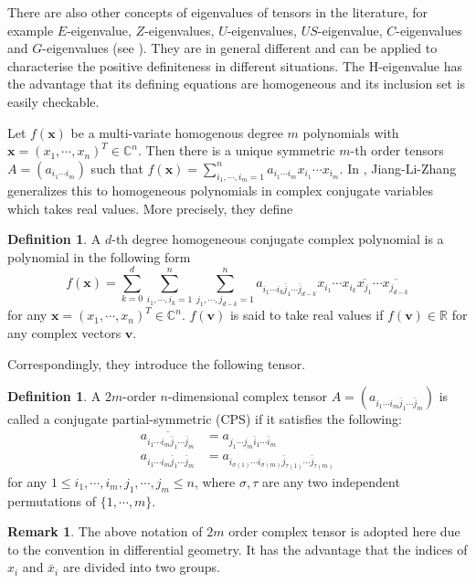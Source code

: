 \documentclass[10pt,reqno]{amsart}
\theoremstyle{definition}
\newtheorem{defn}[thm]{Definition}
\newtheorem{remk}[thm]{Remark}
\begin{document}
There are also other concepts of eigenvalues of tensors in the literature, for example $E$-eigenvalue, $Z$-eigenvalues, $U$-eigenvalues, $US$-eigenvalue, $C$-eigenvalues and $G$-eigenvalues (see \cite{JLZ}\cite{NQB}\cite{N}\cite{Q1}). They are in general different and can be applied to characterise the positive definiteness in different situations. The H-eigenvalue has the advantage that its defining equations are homogeneous and its inclusion set is easily checkable.

  Let $f(\mathbf{x})$ be a multi-variate homogenous degree $m$ polynomials with $\mathbf{x}=(x_1,\cdots, x_n)^T\in \mathbb C^n$. Then there is a unique symmetric $m$-th order tensors $A=(a_{i_1\cdots i_m})$ such that $f(\mathbf{x})=\sum_{i_1,\cdots, i_m=1}^n a_{i_1\cdots i_m} x_{i_1}\cdots x_{i_m}$. In \cite{JLZ},  Jiang-Li-Zhang generalizes this to homogeneous polynomials in complex conjugate variables which takes real values. More precisely, they define
 \begin{defn} 
 A $d$-th degree homogeneous conjugate complex polynomial is a polynomial in the following form
 $$f(\mathbf{x})=\sum_{k=0}^d\sum_{i_1,\cdots, i_k=1}^n\sum_{j_1, \cdots, j_{d-k}=1}^n a_{i_1\cdots i_k \bar{j}_1\cdots \bar{j}_{d-k}} x_{i_1}\cdots x_{i_k}\overline{x_{j_1}}\cdots \overline{x_{j_{d-k}}}$$ for any $\mathbf{x}=(x_1,\cdots, x_n)^T\in \mathbb C^n$. $f(\mathbf{v})$ is said to take real values if $f(\mathbf{v})\in \mathbb R$ for any complex vectors $\mathbf{v}$.
 \end{defn}
 Correspondingly, they introduce the following tensor.
 \begin{defn}
 A $2m$-order $n$-dimensional complex tensor $A=(a_{i_1\cdots i_m\bar{j}_1\cdots \bar{j}_m})$ is called a conjugate partial-symmetric (CPS) if it satisfies the following:
 \begin{align}
\overline{a_{i_1\cdots i_m\bar{j}_1\cdots \bar{j}_m}}&=a_{j_1\cdots j_m\bar{i}_1\cdots \bar{i}_m}\label{sym1} \\
 a_{i_1\cdots i_m\bar{j}_1\cdots \bar{j}_m}&=a_{i_{\sigma(1)}\cdots i_{\sigma(m)}\bar{j}_{\tau(1)}\cdots \bar{j}_{\tau(m)}} \label{symm}
 \end{align}
 for any $1\leq i_1, \cdots, i_m, j_1,\cdots,j_m\leq n$, where $\sigma, \tau$ are any two independent permutations of $\{1,\cdots, m\}$. 
 \end{defn}
\begin{remk}
The above notation of $2m$ order complex tensor is adopted here due to the convention in differential geometry. It has the advantage that the indices of $x_i$ and $\bar{x}_i$ are divided into two groups.
\end{remk}
\end{document}

